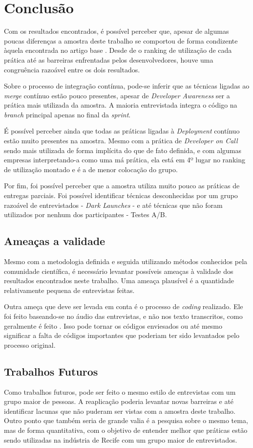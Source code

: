 
\chapter{Conclusão}

Com os resultados encontrados, é possível perceber que, apesar de algumas poucas diferenças a amostra deste trabalho se comportou de forma condizente àquela encontrada no artigo base \cite{empiricalStudy2016}. Desde de o ranking de utilização de cada prática até as barreiras enfrentadas pelos desenvolvedores, houve uma congruência razoável entre os dois resultados. 

Sobre o processo de integração contínua, pode-se inferir que as técnicas ligadas ao \emph{merge} contínuo estão pouco presentes, apesar de \emph{Developer Awareness} ser a prática mais utilizada da amostra. A maioria entrevistada integra o código na \emph{branch} principal apenas no final da \emph{sprint}.

É possível perceber ainda que todas as práticas ligadas à \emph{Deployment} contínuo estão muito presentes na amostra. Mesmo com a prática de \emph{Developer on Call} sendo mais utilizada de forma implícita do que de fato definida, e com algumas empresas interpretando-a como uma má prática, ela está em 4º lugar no ranking de utilização montado e é a de menor colocação do grupo.

Por fim, foi possível perceber que a amostra utiliza muito pouco as práticas de entregas parciais. Foi possível identificar técnicas desconhecidas por um grupo razoável de entrevistados - \emph{Dark Launches} - e até técnicas que não foram utilizados por nenhum dos participantes - Testes A/B.

\section{Ameaças a validade}

Mesmo com a metodologia definida e seguida utilizando métodos conhecidos pela comunidade científica, é necessário levantar possíveis ameaças à validade dos resultados encontrados neste trabalho. Uma ameaça plausível é a quantidade relativamente pequena de entrevistas feitas. 

Outra ameça que deve ser levada em conta é o processo de \emph{coding} realizado. Ele foi feito baseando-se no áudio das entrevistas, e não nos texto transcritos, como geralmente é feito \cite{groundedTheory}. Isso pode tornar os códigos enviesados ou até mesmo significar a falta de códigos importantes que poderiam ter sido levantados pelo processo original.


\section{Trabalhos Futuros}

Como trabalhos futuros, pode ser feito o mesmo estilo de entrevistas com um grupo maior de pessoas. A reaplicação poderia levantar novas barreiras e até identificar lacunas que não puderam ser vistas com a amostra deste trabalho. Outro ponto que também seria de grande valia é a pesquisa sobre o mesmo tema, mas de forma quantitativa, com o objetivo de entender melhor que práticas estão sendo utilizadas na indústria de Recife com um grupo maior de entrevistados. 
